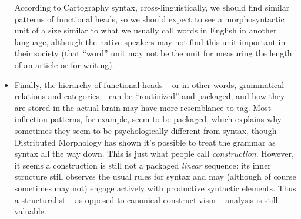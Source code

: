 \documentclass[a4paper, oneside]{report}
\newcommand*{\term}[1]{\emph{#1}}
\begin{document}
\begin{itemize}
        According to Cartography syntax, 
        cross-linguistically, 
        we should find similar patterns of functional heads,
        so we should expect to see a morphosyntactic unit 
        of a size similar to what we usually call words in English 
        in another language, 
        although the native speakers may not find this unit important in their society 
        (that ``word'' unit may not be the unit for measuring the length of an article or for writing).
    \item Finally, the hierarchy of functional heads -- or in other words, 
        grammatical relations and categories -- 
        can be ``routinized'' and packaged,
        and how they are stored in the actual brain 
        may have more resemblance to \ac{tag}. 
        Most inflection patterns, for example, 
        seem to be packaged, 
        which explains why sometimes they seem to be psychologically different from syntax, 
        though Distributed Morphology has shown it's possible to treat the grammar 
        as syntax all the way down. 
        This is just what people call \term{construction}.
        However, it seems a construction is still not a packaged \emph{linear} sequence: 
        its inner structure still observes the usual rules for syntax 
        and may (although of course sometimes may not) engage 
        actively with productive syntactic elements. 
        Thus a structuralist -- as opposed to canonical constructivism -- 
        analysis is still valuable.
\end{itemize}
\end{document}
